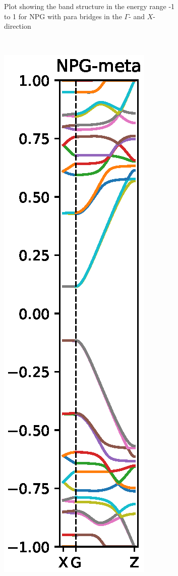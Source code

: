 \begin{figure}
\begin{subfigure}[b]{0.3\textwidth}
        \caption{Plot showing the band structure in the energy range -1 to 1 for NPG with para bridges in the \(\Gamma\)- and \(X\)-direction}
        \label{parabs}
    \end{subfigure}
    ~ %
    \begin{subfigure}[b]{0.3\textwidth}
        \includegraphics[width=\textwidth]{Figures/name/metaNPGBS.eps}

\end{subfigure}
\end{figure}
